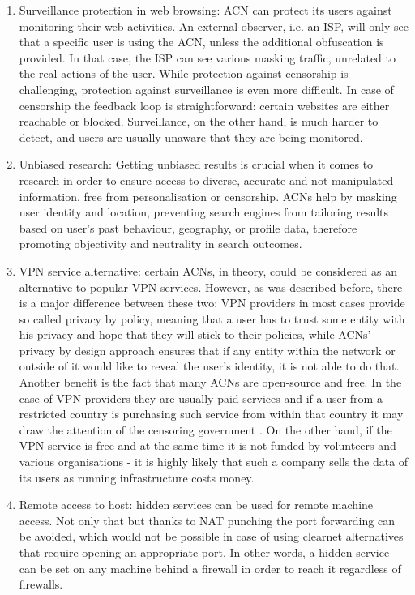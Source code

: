 \begin{enumerate}
    \item Surveillance protection in web browsing: ACN can protect its users against monitoring their web activities. An external observer, i.e. an ISP, will only see that a specific user is using the ACN, unless the additional obfuscation is provided. In that case, the ISP can see various masking traffic, unrelated to the real actions of the user. 
    While protection against censorship is challenging, protection against surveillance is even more difficult. In case of censorship the feedback loop is straightforward: certain websites are either reachable or blocked. Surveillance, on the other hand, is much harder to detect, and users are usually unaware that they are being monitored.
    \item Unbiased research: Getting unbiased results is crucial when it comes to research in order to ensure access to diverse, accurate and not manipulated information, free from personalisation or censorship. ACNs help by masking user identity and location, preventing search engines from tailoring results based on user’s past behaviour, geography, or profile data, therefore promoting objectivity and neutrality in search outcomes.
    \item VPN service alternative: certain ACNs, in theory, could be considered as an alternative to popular VPN services. However, as was described before, there is a major difference between these two: VPN providers in most cases provide so called privacy by policy, meaning that a user has to trust some entity with his privacy and hope that they will stick to their policies, while ACNs’ privacy by design approach ensures that if any entity within the network or outside of it would like to reveal the user’s identity, it is not able to do that.
    Another benefit is the fact that many ACNs are open-source and free. In the case of VPN providers they are usually paid services and if a user from a restricted country is purchasing such service from within that country it may draw the attention of the censoring government \cite{russia}. On the other hand, if the VPN service is free and at the same time it is not funded by volunteers and various organisations - it is highly likely that such a company sells the data of its users as running infrastructure costs money.
    \item Remote access to host: hidden services can be used for remote machine access. Not only that but thanks to NAT punching the port forwarding can be avoided, which would not be possible in case of using clearnet alternatives that require opening an appropriate port. In other words, a hidden service can be set on any machine behind a firewall in order to reach it regardless of firewalls.

\end{enumerate}
